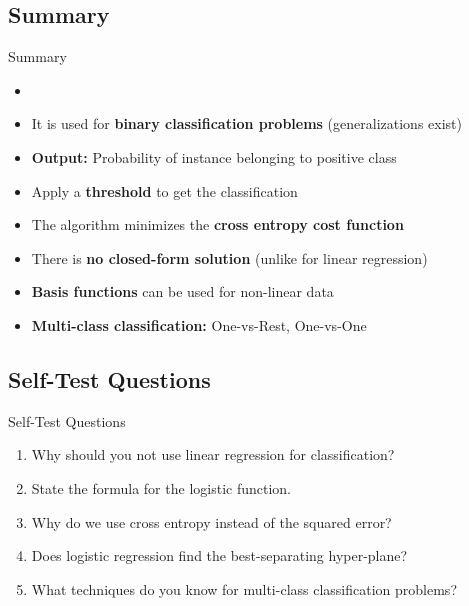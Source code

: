 \subsection{Summary}

\begin{frame}{Summary}{}
	\begin{itemize}
		\item {}
		\item It is used for \textbf{binary classification problems} (generalizations exist)
		\item \textbf{Output:} Probability of instance belonging to positive class
		\item Apply a \textbf{threshold} to get the classification
		\item The algorithm minimizes the \textbf{cross entropy cost function}
		\item There is \textbf{no closed-form solution} (unlike for linear regression)
		\item \textbf{Basis functions} can be used for non-linear data
		\item \textbf{Multi-class classification:} One-vs-Rest, One-vs-One
	\end{itemize}
\end{frame}


\subsection{Self-Test Questions}

\begin{frame}{Self-Test Questions}{}\important
	\begin{enumerate}
		\item Why should you not use linear regression for classification?
		\item State the formula for the logistic function.
		\item Why do we use cross entropy instead of the squared error?
		\item Does logistic regression find the best-separating hyper-plane?
		\item What techniques do you know for multi-class classification problems?
	\end{enumerate}
\end{frame}


